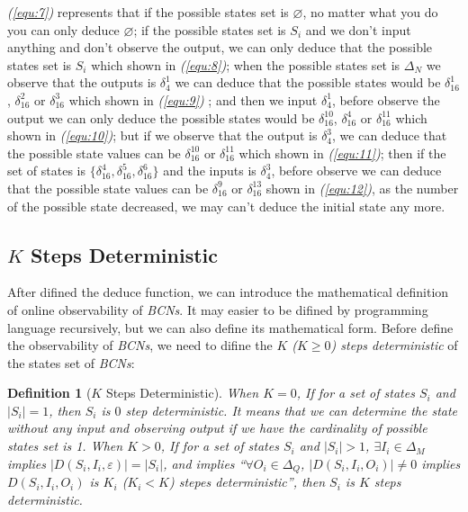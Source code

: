 \documentclass[conference]{IEEEtran} %
\newtheorem{definition}{Definition}
\begin{document}
{\em (\ref{equ:7})} represents that if the possible states set is $\varnothing$, no matter what you do you can only deduce $\varnothing$; if the possible states set is $S_i$ and we don't input anything and don't observe the output, we can only deduce that the possible states set is $S_i$ which shown in {\em (\ref{equ:8})}; when the possible states set is $\Delta_N$ we observe that the outputs is $\delta_4^1$ we can deduce that the possible states would be $\delta_{16}^1$, $\delta_{16}^2$ or  $\delta_{16}^3$ which shown in {\em (\ref{equ:9})} ; and then we input $\delta_4^1$, before observe the output we can only deduce the possible states would be   $\delta_{16}^{10}$, $\delta_{16}^4$ or  $\delta_{16}^{11}$ which shown in {\em (\ref{equ:10})}; but if we observe that the output is $\delta_4^3$, we can deduce that the possible state values can be $\delta_{16}^{10}$ or  $\delta_{16}^{11}$ which shown in {\em (\ref{equ:11})}; then if the set of states is $\{\delta_{16}^4,\delta_{16}^5,\delta_{16}^6\}$ and the inputs is $\delta_4^3$, before observe we can deduce that the possible state values can be $\delta_{16}^9$ or  $\delta_{16}^{13}$ shown in {\em (\ref{equ:12})}, as  the number of the possible state decreased, we may can't deduce the initial state any more. 

\subsection{$K$ Steps Deterministic}
After difined the deduce function, we can introduce the mathematical definition of online observability of {\em BCNs}. It may easier to be difined by programming language recursively, but we can also define its mathematical form. Before define the observability of {\em BCNs}, we need to difine the  {\em  $K$ ($K\ge0$) steps deterministic} of the states set of {\em BCNs}:\\
\begin{definition}[$K$ Steps Deterministic] 
When $K=0$, 
 If for a set of states $S_i$ and $|S_i|=1$, then $S_i$ is $0$ step deterministic. It means that we can determine the state without any input and observing output if we have the cardinality of possible states set is 1. When $K>0$, 
 If for a set of states $S_i$ and $|S_i|>1$, $\exists I_i \in \Delta_M$ implies $|D\left(S_i,I_i,\varepsilon\right)|=|S_i|$, and implies ``$\forall O_i\in \Delta_Q$, $|D\left(S_i,I_i,O_i\right)|\neq 0$ implies $D\left(S_i,I_i,O_i\right)$ is $K_i$ ($K_i<K$) stepes deterministic'', then $S_i$ is $K$ steps deterministic.
\end{definition}
\end{document}
